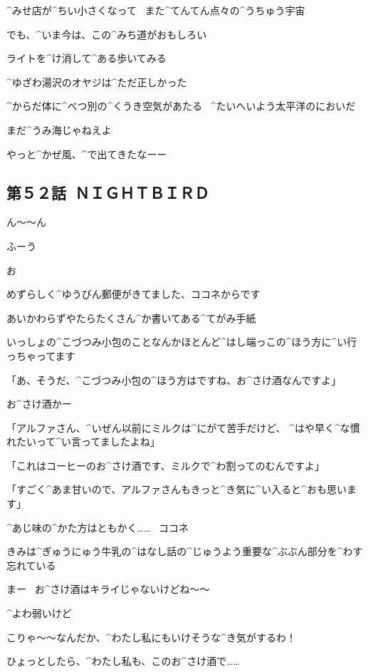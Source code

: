 \Y ^{みせ}{店}が^{ちい}{小}さくなって
\ また^{てんてん}{点々}の^{うちゅう}{宇宙}

\Y でも、^{いま}{今}は、この^{みち}{道}がおもしろい

\Y ライトを^{け}{消}して^{ある}{歩}いてみる

\Y ^{ゆざわ}{湯沢}のオヤジは^{ただ}{正}しかった

\page[119]
\Y ^{からだ}{体}に^{べつ}{別}の^{くうき}{空気}があたる
\ ^{たいへいよう}{太平洋}のにおいだ

\Y まだ^{うみ}{海}じゃねえよ

\page
\A やっと^{かぜ}{風}、^{で}{出}てきたなーー


\subsection{第５２話\ ＮＩＧＨＴＢＩＲＤ}

\page[122]
\A ん〜〜ん

\A ふーう

\page
\A お

\page
\A めずらしく^{ゆうびん}{郵便}がきてました、ココネからです

\A あいかわらずやたらたくさん^{か}{書}いてある^{てがみ}{手紙}

\A いっしょの^{こづつみ}{小包}のことなんかほとんど^{はし}{端}っこの^{ほう}{方}に^{い}{行}っちゃってます

\page
\K 「あ、そうだ、^{こづつみ}{小包}の^{ほう}{方}はですね、お^{さけ}{酒}なんですよ」

\A お^{さけ}{酒}かー

\K 「アルファさん、^{いぜん}{以前}にミルクは^{にがて}{苦手}だけど、
  ^{はや}{早}く^{な}{慣}れたいって^{い}{言}ってましたよね」

\K 「これはコーヒーのお^{さけ}{酒}です、ミルクで^{わ}{割}ってのむんですよ」

\K 「すごく^{あま}{甘}いので、アルファさんもきっと^{き}{気}に^{い}{入}ると^{おも}{思}います」

\A ^{あじ}{味}の^{かた}{方}はともかく……
\ ココネ

\A きみは^{ぎゅうにゅう}{牛乳}の^{はなし}{話}の^{じゅうよう}{重要}な^{ぶぶん}{部分}を^{わす}{忘}れている

\page
\A まー
\ お^{さけ}{酒}はキライじゃないけどね〜〜

\A ^{よわ}{弱}いけど

\page[128]
\A こりゃ〜〜なんだか、^{わたし}{私}にもいけそうな^{き}{気}がするわ！

\A ひょっとしたら、^{わたし}{私}も、このお^{さけ}{酒}で……


